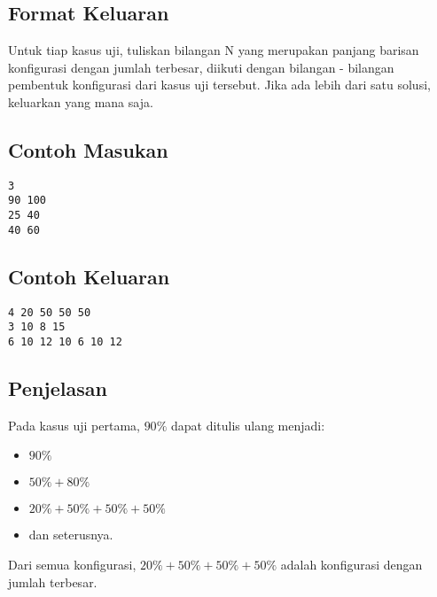 \documentclass{article}
\begin{document}
\subsection*{Format Keluaran}

Untuk tiap kasus uji, tuliskan bilangan N yang merupakan panjang barisan konfigurasi dengan jumlah terbesar, diikuti dengan bilangan - bilangan pembentuk konfigurasi dari kasus uji tersebut. Jika ada lebih dari satu solusi, keluarkan yang mana saja.
\\

\begin{multicols}{2}
\subsection*{Contoh Masukan}
\begin{lstlisting}
3
90 100
25 40
40 60
\end{lstlisting}
\columnbreak
\subsection*{Contoh Keluaran}
\begin{lstlisting}
4 20 50 50 50
3 10 8 15
6 10 12 10 6 10 12

\end{lstlisting}
\vfill
\null
\end{multicols}

\subsection*{Penjelasan}
Pada kasus uji pertama, $90\%$ dapat ditulis ulang menjadi:

\begin{itemize}
    \setlength\itemsep{0pt}
    \item $90\%$
    \item $50\% + 80\%$
    \item $20\% + 50\% + 50\% + 50\%$
    \item dan seterusnya.
\end{itemize}

Dari semua konfigurasi, $20\% + 50\% + 50\% + 50\%$ adalah konfigurasi dengan jumlah terbesar.

\pagebreak
\end{document}
